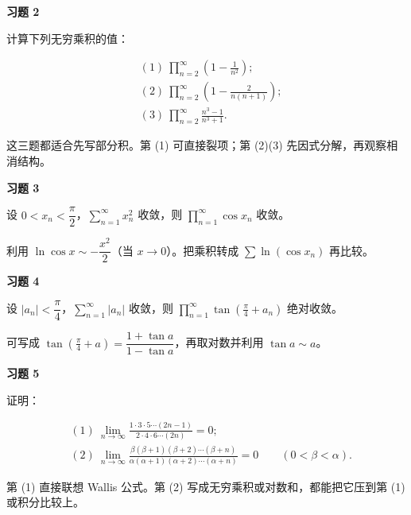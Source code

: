 \begin{exercisebox}
\textbf{习题 2 }

计算下列无穷乘积的值：

\[
      \begin{aligned}
      &(1)\ \prod_{n=2}^{\infty}\left(1-\frac1{n^2}\right);\\
      &(2)\ \prod_{n=2}^{\infty}\left(1-\frac{2}{n(n+1)}\right);\\
      &(3)\ \prod_{n=2}^{\infty}\frac{n^3-1}{n^3+1}.
      \end{aligned}
      \]

\begin{hintbox}
这三题都适合先写部分积。第 (1) 可直接裂项；第 (2)(3) 先因式分解，再观察相消结构。
\end{hintbox}
\end{exercisebox}

\begin{exercisebox}
\textbf{习题 3 }

设 \(0<x_n<\dfrac{\pi}{2}\)，\(\displaystyle\sum_{n=1}^{\infty}x_n^2\) 收敛，则 \(\displaystyle\prod_{n=1}^{\infty}\cos x_n\) 收敛。

\begin{hintbox}
利用 \(\ln\cos x\sim-\dfrac{x^2}{2}\)（当 \(x\to0\)）。把乘积转成 \(\sum \ln(\cos x_n)\) 再比较。
\end{hintbox}
\end{exercisebox}

\begin{exercisebox}
\textbf{习题 4 }

设 \(|a_n|<\dfrac{\pi}{4}\)，\(\displaystyle\sum_{n=1}^{\infty}|a_n|\) 收敛，则 \(\displaystyle\prod_{n=1}^{\infty}\tan\left(\frac{\pi}{4}+a_n\right)\) 绝对收敛。

\begin{hintbox}
可写成 \(\tan(\frac{\pi}{4}+a)=\dfrac{1+\tan a}{1-\tan a}\)，再取对数并利用 \(\tan a\sim a\)。
\end{hintbox}
\end{exercisebox}

\begin{exercisebox}
\textbf{习题 5 }

证明：

\[
      \begin{aligned}
      &(1)\ \lim_{n\to\infty}\frac{1\cdot3\cdot5\cdots(2n-1)}{2\cdot4\cdot6\cdots(2n)}=0;\\
      &(2)\ \lim_{n\to\infty}\frac{\beta(\beta+1)(\beta+2)\cdots(\beta+n)}
      {\alpha(\alpha+1)(\alpha+2)\cdots(\alpha+n)}=0\qquad(0<\beta<\alpha).
      \end{aligned}
      \]

\begin{hintbox}
第 (1) 直接联想 Wallis 公式。第 (2) 写成无穷乘积或对数和，都能把它压到第 (1) 或积分比较上。
\end{hintbox}
\end{exercisebox}

